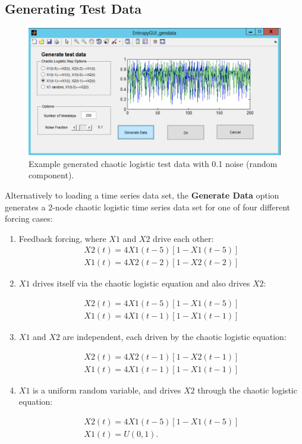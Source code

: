 \documentclass[a4paper]{article}
\begin{document}
\subsection{Generating Test Data}

\begin{figure}[h!]\label{fig:gendata}
\begin{center}
\includegraphics[scale=.5]{Image_GenData.pdf}
\caption{Example generated chaotic logistic test data with 0.1 noise (random component).}
\end{center}
\end{figure}

Alternatively to loading a time series data set, the \textbf{Generate Data} option generates a 2-node chaotic logistic time series data set for one of four different forcing cases: 

\begin{enumerate}
\item{Feedback forcing, where $X1$ and $X2$ drive each other:
\begin{align}
X2(t) = 4X1(t-5)[1-X1(t-5)] \\
X1(t) = 4X2(t-2)[1-X2(t-2)]
\end{align}
}

\item{$X1$ drives itself via the chaotic logistic equation and also drives $X2$:

\begin{align}
X2(t) = 4X1(t-5)[1-X1(t-5)] \\
X1(t) = 4X1(t-1)[1-X1(t-1)]
\end{align}
}

\item{$X1$ and $X2$ are independent, each driven by the chaotic logistic equation:

\begin{align}
X2(t) = 4X2(t-1)[1-X2(t-1)] \\
X1(t) = 4X1(t-1)[1-X1(t-1)]
\end{align}
}

\item{$X1$ is a uniform random variable, and drives $X2$ through the chaotic logistic equation:

\begin{align}
X2(t) = 4X1(t-5)[1-X1(t-5)] \\
X1(t) = U(0,1).
\end{align}
}

\end{enumerate}
\end{document}
